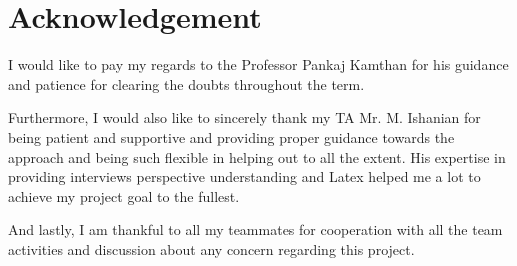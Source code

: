 \documentclass[12pt]{report}
\begin{document}
\vspace{\baselineskip}

\vspace{\baselineskip}

\vspace{\baselineskip}

\vspace{\baselineskip}

\vspace{\baselineskip}

\vspace{\baselineskip}

\vspace{\baselineskip}

\vspace{\baselineskip}

\vspace{\baselineskip}

\vspace{\baselineskip}

\vspace{\baselineskip}

\vspace{\baselineskip}

\vspace{\baselineskip}
\section*{Acknowledgement}

\vspace{\baselineskip}
\begin{justify}
I would like to pay my regards to the Professor Pankaj Kamthan for his guidance and patience for clearing the doubts throughout the term. 
\end{justify}\par


\vspace{\baselineskip}
\begin{justify}
Furthermore, I would also like to sincerely thank my TA Mr. M. Ishanian for being patient and supportive and providing proper guidance towards the approach and being such flexible in helping out to all the extent. His expertise in providing interviews perspective understanding and Latex helped me a lot to achieve my project goal to the fullest. 
\end{justify}\par


\vspace{\baselineskip}
\begin{justify}
And lastly, I am thankful to all my teammates for cooperation with all the team activities and discussion about any concern regarding this project.
\end{justify}\par
\end{document}
